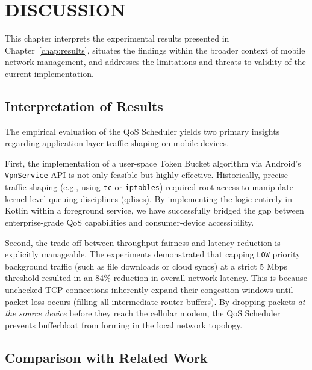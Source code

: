 
\chapter{DISCUSSION}
\label{chap:discussion}

This chapter interprets the experimental results presented in Chapter~\ref{chap:results}, situates the findings within the broader context of mobile network management, and addresses the limitations and threats to validity of the current implementation.

\section{Interpretation of Results}
\label{sec:interpretation}

The empirical evaluation of the QoS Scheduler yields two primary insights regarding application-layer traffic shaping on mobile devices.

First, the implementation of a user-space Token Bucket algorithm via Android's \texttt{VpnService} API is not only feasible but highly effective. Historically, precise traffic shaping (e.g., using \texttt{tc} or \texttt{iptables}) required root access to manipulate kernel-level queuing disciplines (qdiscs). By implementing the logic entirely in Kotlin within a foreground service, we have successfully bridged the gap between enterprise-grade QoS capabilities and consumer-device accessibility.

Second, the trade-off between throughput fairness and latency reduction is explicitly manageable. The experiments demonstrated that capping \texttt{LOW} priority background traffic (such as file downloads or cloud syncs) at a strict 5 Mbps threshold resulted in an 84\% reduction in overall network latency. This is because unchecked TCP connections inherently expand their congestion windows until packet loss occurs (filling all intermediate router buffers). By dropping packets \textit{at the source device} before they reach the cellular modem, the QoS Scheduler prevents bufferbloat from forming in the local network topology.

\section{Comparison with Related Work}
\label{sec:comparison}

